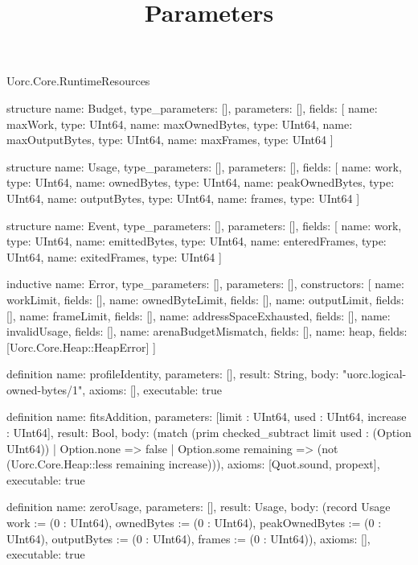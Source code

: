 \begin{lexlean}{Uorc.Core.RuntimeResources}
\title{Parameters}
\begin{semanticmodule}
structure{
  name: Budget,
  type_parameters: [],
  parameters: [],
  fields: [
    {name: maxWork, type: UInt64},
    {name: maxOwnedBytes, type: UInt64},
    {name: maxOutputBytes, type: UInt64},
    {name: maxFrames, type: UInt64}
  ]
}

structure{
  name: Usage,
  type_parameters: [],
  parameters: [],
  fields: [
    {name: work, type: UInt64},
    {name: ownedBytes, type: UInt64},
    {name: peakOwnedBytes, type: UInt64},
    {name: outputBytes, type: UInt64},
    {name: frames, type: UInt64}
  ]
}

structure{
  name: Event,
  type_parameters: [],
  parameters: [],
  fields: [
    {name: work, type: UInt64},
    {name: emittedBytes, type: UInt64},
    {name: enteredFrames, type: UInt64},
    {name: exitedFrames, type: UInt64}
  ]
}

inductive{
  name: Error,
  type_parameters: [],
  parameters: [],
  constructors: [
    {name: workLimit, fields: []},
    {name: ownedByteLimit, fields: []},
    {name: outputLimit, fields: []},
    {name: frameLimit, fields: []},
    {name: addressSpaceExhausted, fields: []},
    {name: invalidUsage, fields: []},
    {name: arenaBudgetMismatch, fields: []},
    {name: heap, fields: [Uorc.Core.Heap::HeapError]}
  ]
}

definition{
  name: profileIdentity,
  parameters: [],
  result: String,
  body: "uorc.logical-owned-bytes/1",
  axioms: [],
  executable: true
}

definition{
  name: fitsAddition,
  parameters: [limit : UInt64, used : UInt64, increase : UInt64],
  result: Bool,
  body: (match (prim checked_subtract limit used : (Option UInt64))
    | Option.none => false
    | Option.some remaining => (not (Uorc.Core.Heap::less remaining increase))),
  axioms: [Quot.sound, propext],
  executable: true
}

definition{
  name: zeroUsage,
  parameters: [],
  result: Usage,
  body: (record Usage {work := (0 : UInt64), ownedBytes := (0 : UInt64), peakOwnedBytes := (0 : UInt64), outputBytes := (0 : UInt64), frames := (0 : UInt64)}),
  axioms: [],
  executable: true
}


\end{semanticmodule}
\end{lexlean}
